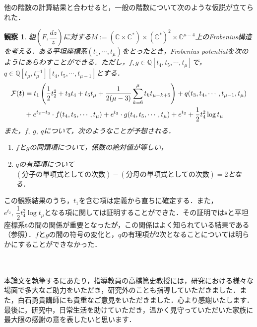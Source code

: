 \documentclass[a4paper,11pt]{jbook}
\theoremstyle{plain}
\newtheorem*{observ*}{観察}
\theoremstyle{definition}
\theoremstyle{remark}
\theoremstyle{proof}
\numberwithin{equation}{section}
\def\CC{{\mathbb C}}
\def\QQ{{\mathbb Q}}
\def\F{{\mathcal F}}
\begin{document}
	他の階数の計算結果と合わせると，一般の階数について次のような仮説が立てられた．
\begin{observ*}\rm 
組$\left(F,\dfrac{dz}{z}\right)$に対する$M:=(\CC\times\CC^*)\times(\CC^*)^{2}\times\CC^{\mu-4}$上のFrobenius構造を考える．ある平坦座標系$(t_1, \cdots, t_\mu)$をとったとき，Frobenius potentialを次のようにあらわすことができる．ただし，$f,g \in \QQ[t_4, t_5, \cdots, t_{\mu}]$で，$q \in \QQ[t_\mu, t_\mu^{-1}][t_4, t_5, \cdots, t_{\mu-1}]$とする．
\begin{align*}
\F(\bm{t})&=t_1\left(\frac{1}{2}t_2^2+t_3t_4+t_5t_\mu+\frac{1}{2(\mu-3)}\sum_{k=6}^{\mu}t_kt_{\mu-k+5}\right) 
+q(t_3,t_4,\cdots,t_{\mu-1}, t_\mu) \notag \\
&+e^{t_2-t_3}\cdot f(t_4,t_5,\cdots,t_\mu)  
+e^{t_3}\cdot g(t_4,t_5,\cdots,t_\mu)
+e^{t_2}+\frac{1}{2}t_4^2\log{t_\mu} \notag
\end{align*}
また，$f, \ g, \ q$について，次のようなことが予想される．
\begin{enumerate}
\item[o1.] $f$と$g$の同類項について，係数の絶対値が等しい，

\item[o2.] $q$の有理項について$(分子の単項式としての次数)-(分母の単項式としての次数)=2$となる．
\end{enumerate}
\end{observ*}

	この観察結果のうち，$t_1$を含む項は定義から直ちに確定する．また，$e^{t_2}, \ \dfrac{1}{2}t_4^2\log{t_\mu}$となる項に関しては証明することができた．その証明では$\bm{s}$と平坦座標系$\bm{t}$の間の関係が重要となったが，この関係はよく知られている結果である（参照\cite{d:1,S1202-Saito,sat,tak:2}）．$f$と$g$の間の符号の変化と，$q$の有理項が$2$次となることについては明らかにすることができなかった．
\\ \\ \\

	本論文を執筆するにあたり，指導教員の高橋篤史教授には，研究における様々な場面で多大なご助力をいただき，研究外のことも指導していただきました．また，白石勇貴講師にも貴重なご意見をいただきました．心より感謝いたします．
	最後に，研究中，日常生活を助けていただき，温かく見守っていただいた家族に最大限の感謝の意を表したいと思います．


\end{document}
